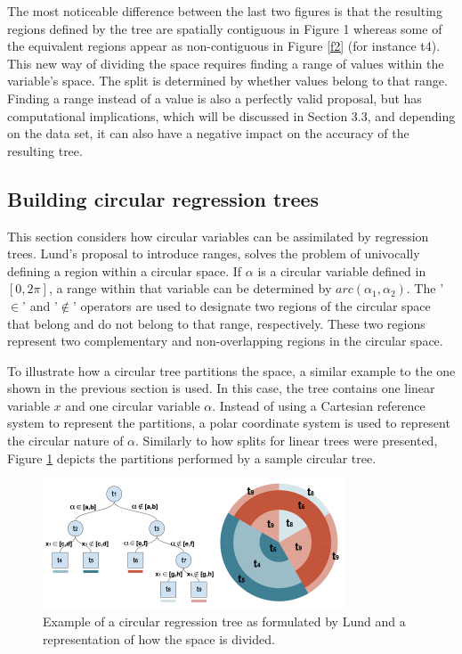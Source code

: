 \documentclass[times,twocolumn,final,authoryear]{elsarticle}
\begin{document}
The most noticeable difference between the last two figures is that the resulting regions defined by the tree are spatially contiguous in Figure 1 whereas some of the equivalent regions appear as non-contiguous in Figure \ref{f2} (for instance t4). This new way of dividing the space requires finding a range of values within the variable’s space. The split is determined by whether values belong to that range. Finding a range instead of a value is also a perfectly valid proposal, but has computational implications, which will be discussed in Section 3.3, and depending on the data set, it can also have a negative impact on the accuracy of the resulting tree.

\subsection{Building circular regression trees}

This section considers how circular variables can be assimilated by regression trees. Lund's proposal to introduce ranges, solves the problem of univocally defining a region within a circular space. If $\alpha$ is a circular variable defined in $[0, 2\pi]$, a range within that variable can be determined by $arc(\alpha_1, \alpha_2)$. The '$\in$' and '$\notin$' operators are used to designate two regions of the circular space that belong and do not belong to that range, respectively. These two regions represent two complementary and non-overlapping regions in the circular space.

To illustrate how a circular tree partitions the space, a similar example to the one shown in the previous section is used. In this case, the tree contains one linear variable $x$ and one circular variable $\alpha$. Instead of using a Cartesian reference system to represent the partitions, a polar coordinate system is used to represent the circular nature of $\alpha$. Similarly to how splits for linear trees were presented, Figure \ref{f3} depicts the partitions performed by a sample circular tree.

%
\begin{figure}
  \includegraphics[width=9cm]{fig3_master2.png}
\caption{Example of a circular regression tree as formulated by Lund and a representation of how the space is divided.}
\label{f3}       %
\end{figure}
%
\end{document}
